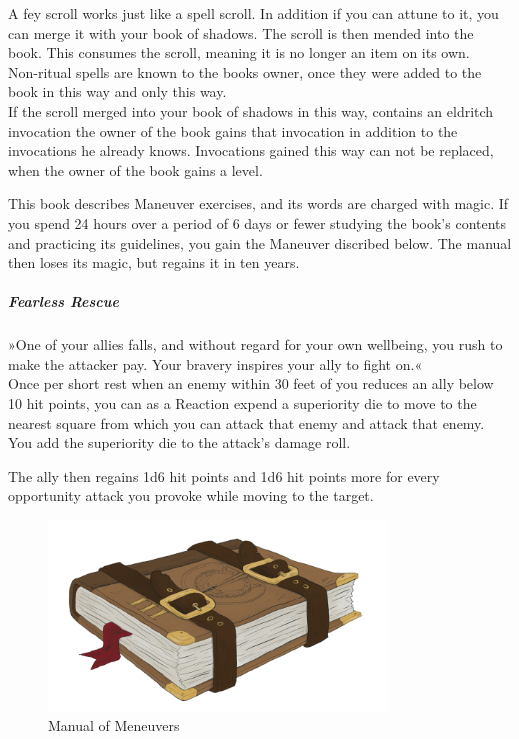 \documentclass[letter,10pt,twocolumn,openany]{dndbook}
\begin{document}

A fey scroll works just like a spell scroll. In addition if you can attune to it, you can merge it with your book of shadows. The scroll is then mended into the book. This consumes the scroll, meaning it is no longer an item on its own.\\
Non-ritual spells are known to the books owner, once they were added to the book in this way and only this way.\\
If the scroll merged into your book of shadows in this way, contains an eldritch invocation the owner of the book gains that invocation in addition to the invocations he already knows. Invocations gained this way can not be replaced, when the owner of the book gains a level.

This book describes Maneuver exercises, and its words are charged with magic. If you spend 24 hours over a period of 6 days or fewer studying the book's contents and practicing its guidelines, you gain the Maneuver discribed below. The manual then loses its magic, but regains it in ten years.\\

\subparagraph{Fearless Rescue}

»One of your allies falls, and without regard for your own wellbeing, you rush to make the attacker pay. Your bravery inspires your ally to fight on.«\\

Once per short rest when an enemy within 30 feet of you reduces an ally below 10 hit points, you can as a Reaction expend a superiority die to move to the nearest square from which you can attack that enemy and attack that enemy. You add the superiority die to the attack's damage roll.

The ally then regains 1d6 hit points and 1d6 hit points more for every opportunity attack you provoke while moving to the target.

\begin{figure}
    \includegraphics[width=9cm]{images/manual_of_maneuvers.png}
    \caption{Manual of Meneuvers}
\end{figure}
\end{document}
